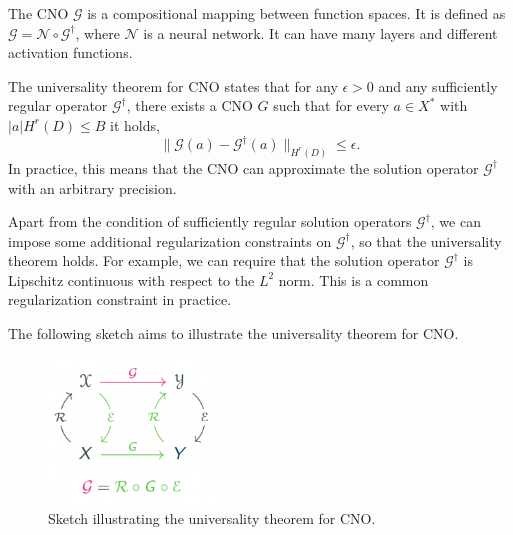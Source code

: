 \documentclass[unicode,11pt,a4paper,oneside,numbers=endperiod,openany]{scrartcl}
\begin{document}
The CNO $\mathcal{G}$ is a compositional mapping
between function spaces. It is defined as $\mathcal{G} = \mathcal{N} \circ \mathcal{G}^{\dagger}$,
where $\mathcal{N}$ is a neural network. It can have many layers and different
activation functions. 

The universality theorem for CNO states that for any $\epsilon > 0$ and any
sufficiently regular operator $\mathcal{G}^{\dagger}$,
there exists a CNO $G$ such that for every $a \in X^*$ with $|a|H^r(D) \leq B$
it holds,
\begin{equation}
    \|\mathcal{G}(a) - \mathcal{G}^{\dagger}(a)\|_{H^r(D)} \leq \epsilon.
\end{equation}
In practice, this means that the CNO can approximate the solution operator
$\mathcal{G}^{\dagger}$ with an arbitrary precision.

\cite{raonic2023convolutional}
Apart from the condition of sufficiently regular solution operators
$\mathcal{G}^{\dagger}$, we can impose some additional regularization
constraints on $\mathcal{G}^{\dagger}$, so that the universality theorem holds.
For example, we can require that the solution operator $\mathcal{G}^{\dagger}$
is Lipschitz continuous with respect to the $L^2$ norm. This is a common
regularization constraint in practice.

The following sketch aims to illustrate the universality theorem for CNO.
\begin{figure}[ht!]
    \centering
    \includegraphics[width=0.4\textwidth]{../task3/universality.png}
    \caption{Sketch illustrating the universality theorem for CNO.}
    \label{fig:universality}
\end{figure}



\end{document}
